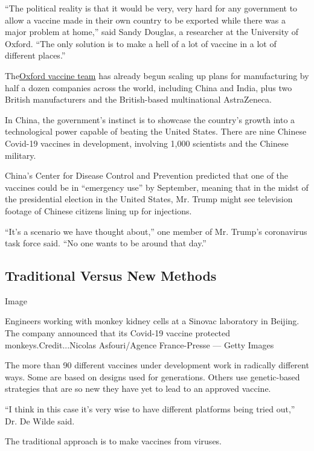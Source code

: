 ``The political reality is that it would be very, very hard for any
government to allow a vaccine made in their own country to be exported
while there was a major problem at home,'' said Sandy Douglas, a
researcher at the University of Oxford. ``The only solution is to make a
hell of a lot of vaccine in a lot of different places.''

The\href{https://www.nytimes3xbfgragh.onion/2020/04/27/world/europe/coronavirus-vaccine-update-oxford.html}{Oxford
vaccine team} has already begun scaling up plans for manufacturing by
half a dozen companies across the world, including China and India, plus
two British manufacturers and the British-based multinational
AstraZeneca.

In China, the government's instinct is to showcase the country's growth
into a technological power capable of beating the United States. There
are nine Chinese Covid-19 vaccines in development, involving 1,000
scientists and the Chinese military.

China's Center for Disease Control and Prevention predicted that one of
the vaccines could be in ``emergency use'' by September, meaning that in
the midst of the presidential election in the United States, Mr. Trump
might see television footage of Chinese citizens lining up for
injections.

``It's a scenario we have thought about,'' one member of Mr. Trump's
coronavirus task force said. ``No one wants to be around that day.''

\hypertarget{traditional-versus-new-methods}{%
\subsection{Traditional Versus New
Methods}\label{traditional-versus-new-methods}}

Image

Engineers working with monkey kidney cells at a Sinovac laboratory in
Beijing. The company announced that its Covid-19 vaccine protected
monkeys.Credit...Nicolas Asfouri/Agence France-Presse --- Getty Images

The more than 90 different vaccines under development work in radically
different ways. Some are based on designs used for generations. Others
use genetic-based strategies that are so new they have yet to lead to an
approved vaccine.

``I think in this case it's very wise to have different platforms being
tried out,'' Dr. De Wilde said.

The traditional approach is to make vaccines from viruses.


